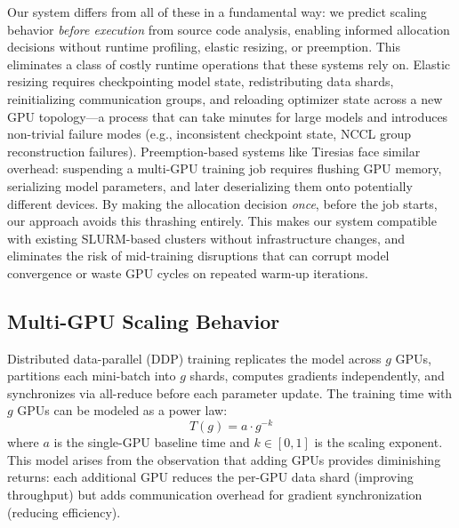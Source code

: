 \documentclass[letterpaper,10pt]{article}
\begin{document}
Our system differs from all of these in a fundamental way: we predict scaling behavior \textit{before execution} from source code analysis, enabling informed allocation decisions without runtime profiling, elastic resizing, or preemption. This eliminates a class of costly runtime operations that these systems rely on. Elastic resizing requires checkpointing model state, redistributing data shards, reinitializing communication groups, and reloading optimizer state across a new GPU topology---a process that can take minutes for large models and introduces non-trivial failure modes (e.g., inconsistent checkpoint state, NCCL group reconstruction failures). Preemption-based systems like Tiresias face similar overhead: suspending a multi-GPU training job requires flushing GPU memory, serializing model parameters, and later deserializing them onto potentially different devices. By making the allocation decision \textit{once}, before the job starts, our approach avoids this thrashing entirely. This makes our system compatible with existing SLURM-based clusters without infrastructure changes, and eliminates the risk of mid-training disruptions that can corrupt model convergence or waste GPU cycles on repeated warm-up iterations.

\subsection{Multi-GPU Scaling Behavior}

Distributed data-parallel (DDP) training replicates the model across $g$ GPUs, partitions each mini-batch into $g$ shards, computes gradients independently, and synchronizes via all-reduce before each parameter update. The training time with $g$ GPUs can be modeled as a power law:
\begin{equation}
    T(g) = a \cdot g^{-k}
    \label{eq:scaling}
\end{equation}
where $a$ is the single-GPU baseline time and $k \in [0, 1]$ is the scaling exponent. This model arises from the observation that adding GPUs provides diminishing returns: each additional GPU reduces the per-GPU data shard (improving throughput) but adds communication overhead for gradient synchronization (reducing efficiency).
\end{document}
